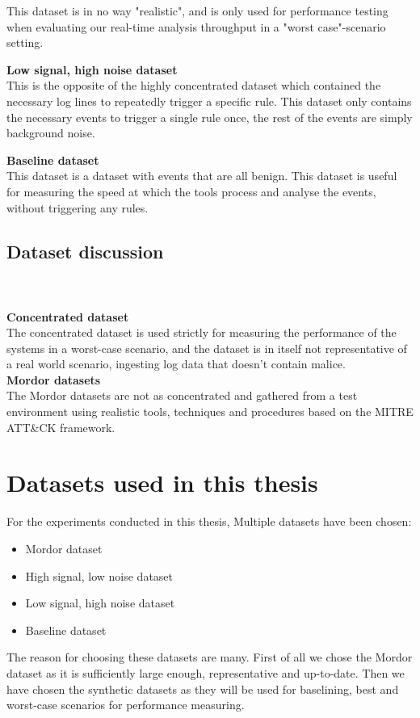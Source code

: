 This dataset is in no way "realistic", and is only used for performance testing when evaluating our real-time analysis throughput in a "worst case"-scenario setting.

\textbf{Low signal, high noise dataset}\\
This is the opposite of the highly concentrated dataset which contained the necessary log lines to repeatedly trigger a specific rule. This dataset only contains the necessary events to trigger a single rule once, the rest of the events are simply background noise.

\textbf{Baseline dataset}\\
This dataset is a dataset with events that are all benign. This dataset is useful for measuring the speed at which the tools process and analyse the events, without triggering any rules.

\subsection{Dataset discussion}
\\
\\
\textbf{Concentrated dataset}\\
The concentrated dataset is used strictly for measuring the performance of the systems in a worst-case scenario, and the dataset is in itself not representative of a real world scenario, ingesting log data that doesn't contain malice.\\
\textbf{Mordor datasets}\\
The Mordor datasets are not as concentrated and gathered from a test environment using realistic tools, techniques and procedures based on the MITRE ATT\&CK framework.

\section{Datasets used in this thesis}
\label{sec:datasets-used}

For the experiments conducted in this thesis, Multiple datasets have been chosen:

\begin{itemize}
    \item Mordor dataset
    \item High signal, low noise dataset
    \item Low signal, high noise dataset
    \item Baseline dataset
\end{itemize}
The reason for choosing these datasets are many. First of all we chose the Mordor dataset as it is sufficiently large enough, representative and up-to-date. Then we have chosen the synthetic datasets as they will be used for baselining, best and worst-case scenarios for performance measuring.

